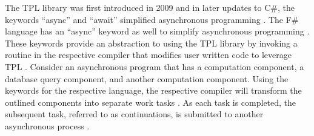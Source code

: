 The TPL library was first introduced in 2009 and in later updates to C\#, the keywords ``async'' and ``await'' simplified asynchronous programming \cite{alexdavies2012}. The F\# language has an ``async'' keyword as well to simplify asynchronous programming \cite{syme2011f}. These keywords provide an abstraction to using the TPL library by invoking a routine in the respective compiler that modifies user written code to leverage TPL \cite{alexdavies2012, syme2011f}. Consider an asynchronous program that has a computation component, a database query component, and another computation component. Using the keywords for the respective language, the respective compiler will transform the outlined components into separate work tasks \cite{alexdavies2012,syme2011f}. As each task is completed, the subsequent task, referred to as continuations, is submitted to another asynchronous process \cite{syme2011f}.
